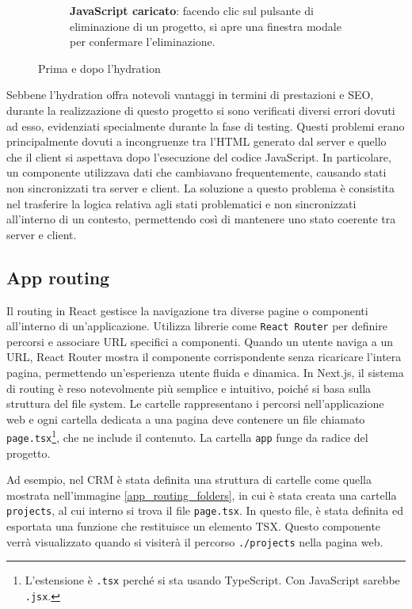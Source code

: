 \documentclass[target=bach,aauheader=,style=]{thud}
\begin{document}
\begin{figure}[H]
\begin{subfigure}[b]{0.46\textwidth}
        \caption{\textbf{JavaScript caricato}: facendo clic sul pulsante di eliminazione di un progetto, si apre una finestra modale per confermare l'eliminazione.}
        \label{fig:img2}
    \end{subfigure}
    \caption{Prima e dopo l'hydration}
    \label{fig:two_images}
\end{figure}

\label{sec:hydration_error}
\noindent Sebbene l'hydration offra notevoli vantaggi in termini di prestazioni e SEO, durante la realizzazione di questo progetto si sono verificati diversi errori dovuti ad esso, evidenziati specialmente durante la fase di testing. Questi problemi erano principalmente dovuti a incongruenze tra l'HTML generato dal server e quello che il client si aspettava dopo l'esecuzione del codice JavaScript. In particolare, un componente utilizzava dati che cambiavano frequentemente, causando stati non sincronizzati tra server e client. La soluzione a questo problema è consistita nel trasferire la logica relativa agli stati problematici e non sincronizzati all'interno di un contesto, permettendo così di mantenere uno stato coerente tra server e client.

\subsection{App routing}
Il routing in React gestisce la navigazione tra diverse pagine o componenti all'interno di un'applicazione. Utilizza librerie come \texttt{React Router} per definire percorsi e associare URL specifici a componenti. Quando un utente naviga a un URL, React Router mostra il componente corrispondente senza ricaricare l'intera pagina, permettendo un'esperienza utente fluida e dinamica. In Next.js, il sistema di routing è reso notevolmente più semplice e intuitivo, poiché si basa sulla struttura del file system. Le cartelle rappresentano i percorsi nell'applicazione web e ogni cartella dedicata a una pagina deve contenere un file chiamato \texttt{page.tsx}\footnote{L'estensione è \texttt{.tsx} perché si sta usando TypeScript. Con JavaScript sarebbe \texttt{.jsx}.}, che ne include il contenuto. La cartella \texttt{app} funge da radice del progetto. 

\noindent Ad esempio, nel CRM è stata definita una struttura di cartelle come quella mostrata nell'immagine \ref{app_routing_folders}, in cui è stata creata una cartella \texttt{projects}, al cui interno si trova il file \texttt{page.tsx}. In questo file, è stata definita ed esportata una funzione che restituisce un elemento TSX. Questo componente verrà visualizzato quando si visiterà il percorso \texttt{./projects} nella pagina web.
\end{document}
